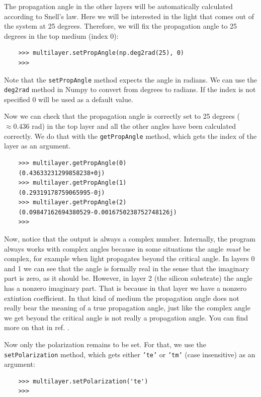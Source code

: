 \documentclass[a4paper,11pt,aps,final]{revtex4}
\begin{document}
The propagation angle in the other layers will be automatically calculated according to Snell's law. Here we will be interested in the light that comes out of the system at 25 degrees. Therefore, we will fix the propagation angle to 25 degrees in the top medium (index 0):

\begin{verbatim}
    >>> multilayer.setPropAngle(np.deg2rad(25), 0)
    >>>
\end{verbatim}

Note that the \texttt{setPropAngle} method expects the angle in radians. We can use the \texttt{deg2rad} method in \textsf{Numpy} to convert from degrees to radians. If the index is not specified 0 will be used as a default value.

Now we can check that the propagation angle is correctly set to 25 degrees ($\approx 0.436$ rad) in the top layer and all the other angles have been calculated correctly. We do that with the \texttt{getPropAngle} method, which gets the index of the layer as an argument.

\begin{verbatim}
    >>> multilayer.getPropAngle(0)
    (0.43633231299858238+0j)
    >>> multilayer.getPropAngle(1)
    (0.29319178759065995-0j)
    >>> multilayer.getPropAngle(2)
    (0.09847162694380529-0.0016750238752748126j)
    >>>
\end{verbatim}

Now, notice that the output is always a complex number. Internally, the program always works with complex angles because in some situations the angle \emph{must} be complex, for example when light propagates beyond the critical angle. In layers 0 and 1 we can see that the angle is formally real in the sense that the imaginary part is zero, as it should be. However, in layer 2 (the silicon substrate) the angle has a nonzero imaginary part. That is because in that layer we have a nonzero extintion coefficient. In that kind of medium the propagation angle does not really bear the meaning of a true propagation angle, just like the complex angle we get beyond the critical angle is not really a propagation angle. You can find more on that in ref. .

Now only the polarization remains to be set. For that, we use the \texttt{setPolarization} method, which gets either \texttt{'te'} or \texttt{'tm'} (case insensitive) as an argument:

\begin{verbatim}
    >>> multilayer.setPolarization('te')
    >>>
\end{verbatim}
\end{document}
